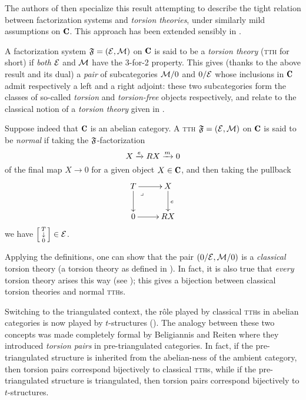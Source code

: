 The authors of \cite{CHK} then specialize this result attempting to describe the tight relation between factorization systems and \emph{torsion theories}, under similarly mild assumptions on $\C$. This approach has been extended sensibly in \cite{rosicky2007factorization}.

A factorization system $\mathfrak{F}=(\mathcal{E},\mathcal{M})$ on $\C$ is said to be a \emph{torsion theory} (\textsc{tth} for short) if \emph{both} $\mathcal{E}$ and $\mathcal{M}$ have the 3-for-2 property. This gives (thanks to the above result and its dual) a \emph{pair} of subcategories $\mathcal{M}/0$ and $0/\mathcal{E}$ whose inclusions in $\C$ admit respectively a left and a right adjoint: these two subcategories form the classes of so\hyp{}called \emph{torsion} and \emph{torsion\hyp{}free} objects respectively, and relate to the classical notion of a \emph{torsion theory} given in \cite{dickson1966torsion}.

Suppose indeed that $\C$ is an abelian category. A \textsc{tth} $\mathfrak{F}=(\mathcal{E},\mathcal{M})$ on $\C$ is said to be \emph{normal} if taking the $\mathfrak{F}$-factorization
\[
X\xrightarrow{e}RX\xrightarrow{m}0
\]
of the final map $X\to 0$ for a given object $X\in \C$, and then taking the pullback
\begin{equation}\label{pb_diagram}
\begin{matrix}\xymatrix{
T\ar[r]\ar[d]\ar@{}[dr]|(.25)\lrcorner&X\ar[d]^{e}\\
0\ar[r]& RX
}\end{matrix}
\end{equation}
we have $\left[ \begin{smallmatrix} T \\ \downarrow \\ 0 \end{smallmatrix}\right]\in \mathcal{E}$.

Applying the definitions, one can show that the pair $(0/\mathcal{E},\mathcal{M}/0)$ is a \emph{classical} torsion theory (\ie a torsion theory as defined in \cite{dickson1966torsion}). In fact, it is also true that \emph{every} torsion theory arises this way (see \cite{rosicky2007factorization}); this gives a bijection between classical torsion theories and normal \textsc{tth}s. 

Switching to the triangulated context, the r\^ole played by classical \textsc{tth}s in abelian categories is now played by $t$-structures (\cite{BBD,keller2007derived}). The analogy between these two concepts was made completely formal by Beligiannis and Reiten \cite{beligiannis-reiten} where they introduced \emph{torsion pairs} in pre-triangulated categories. In fact, if the pre-triangulated structure is inherited from the abelian-ness of the ambient category, then torsion pairs correspond bijectively to classical \textsc{tth}s, while if the pre-triangulated structure is triangulated, then torsion pairs correspond bijectively to $t$-structures.

